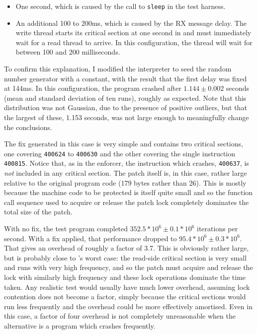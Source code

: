 \begin{itemize}
\item One second, which is caused by the call to \verb|sleep| in the
  test harness.
\item An additional 100 to 200ms, which is caused by the RX
  message delay.  The write thread starts its
  critical section at one second in and must immediately wait for a
  read thread to arrive.  In this configuration, the thread will wait
  for between 100 and 200 milliseconds.
\end{itemize}

To confirm this explanation, I modified the interpreter to seed the
random number generator with a constant, with the result that the
first delay was fixed at 144ms.  In this configuration, the program
crashed after $1.144 \pm 0.002$ seconds (mean and standard deviation
of ten runs), roughly as expected.  Note that this distribution was
not Gaussian, due to the presence of positive outliers, but that the
largest of these, 1.153 seconds, was not large enough to meaningfully
change the conclusions.  

The fix generated in this case is very simple and contains two
critical sections, one covering \verb|400624| to \verb|400630| and the
other covering the single instruction \verb|400815|.  Notice that, as
in the enforcer, the instruction which crashes, \verb|400637|, is
\emph{not} included in any critical section.  The patch itself is, in
this case, rather large relative to the original program code (179
bytes rather than 26).  This is mostly because the machine code to be
protected is itself quite small and so the function call sequence used
to acquire or release the patch lock completely dominates the total
size of the patch.


With no fix, the test program completed $352.5 * 10^6 \pm 0.1 * 10^6$
iterations per second.  With a fix applied, that performance dropped
to $95.4 * 10^6 \pm 0.3 * 10^6$.  That gives an overhead of roughly a
factor of 3.7.  This is obviously rather large, but is probably close
to {\technique}'s worst case: the read-side critical section is very
small and runs with very high frequency, and so the patch must acquire
and release the lock with similarly high frequency and these lock
operations dominate the time taken.  Any realistic test would usually
have much lower overhead, assuming lock contention does not become a
factor, simply because the critical sections would run less frequently
and the overhead could be more effectively amortised.  Even in this
case, a factor of four overhead is not completely unreasonable when
the alternative is a program which crashes frequently.

